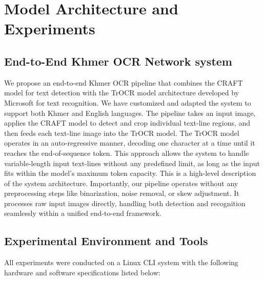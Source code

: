 \chapter{Model Architecture and Experiments}
\label{ch:experiments}


\vspace{-1cm}
\setlength{\parindent}{0pt}
\vspace{0.3cm}

\section{End-to-End Khmer OCR Network system}
\label{sec:end_to_end_khmer_ocr_sysetm}

{\englishfont\fontsize{13.5pt}{17pt}\selectfont

We propose an end-to-end Khmer OCR pipeline that combines the CRAFT model 
for text detection with the TrOCR model architecture developed by Microsoft 
for text recognition. We have customized and adapted the system to support 
both Khmer and English languages. The pipeline takes an input image, applies 
the CRAFT model to detect and crop individual text-line regions, and then 
feeds each text-line image into the TrOCR model.
The TrOCR model operates in an auto-regressive manner, decoding one character 
at a time until it reaches the end-of-sequence token. This approach allows the 
system to handle variable-length input text-lines without any predefined limit, 
as long as the input fits within the model’s maximum token capacity.
This is a high-level description of the system architecture. Importantly, 
our pipeline operates without any preprocessing steps like binarization, 
noise removal, or skew adjustment. It processes raw input images directly, 
handling both detection and recognition seamlessly within a unified end-to-end 
framework.

\section{Experimental Environment and Tools}
\label{sec:environment}

All experiments were conducted on a Linux CLI system with the following hardware
and software specifications listed below:

}
